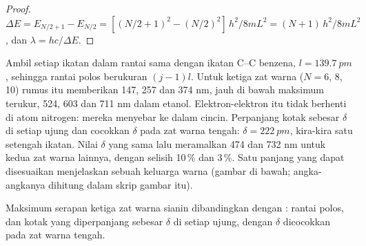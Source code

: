 \begin{proof}
$\Delta E = E_{N/2+1} - E_{N/2} = [(N/2+1)^2 - (N/2)^2]\,h^2/8mL^2 =
(N+1)\,h^2/8mL^2$, dan $\lambda = hc/\Delta E$.
\end{proof}

\begin{example}\label{ex:b3:quantum-model-systems:dyes}
Ambil setiap ikatan dalam rantai sama dengan ikatan C--C benzena,
$l = \qty{139.7}{pm}$, sehingga rantai polos berukuran $(j - 1)l$. Untuk
ketiga zat warna ($N = 6$, 8, 10) rumus itu memberikan 147, 257 dan 374 nm,
jauh di bawah maksimum terukur, 524, 603 dan 711 nm dalam etanol.
Elektron-elektron itu tidak berhenti di atom nitrogen: mereka menyebar ke
dalam cincin. Perpanjang kotak sebesar $\delta$ di setiap ujung dan
cocokkan $\delta$ pada zat warna tengah: $\delta = \qty{222}{pm}$, kira-kira
satu setengah ikatan. Nilai $\delta$ yang sama lalu meramalkan 474 dan
732 nm untuk kedua zat warna lainnya, dengan selisih 10\,\% dan 3\,\%. Satu
panjang yang dapat disesuaikan menjelaskan sebuah keluarga warna (gambar di
bawah; angka-angkanya dihitung dalam skrip gambar itu).
\end{example}

\begin{omfigure}

{\small Maksimum serapan ketiga zat warna sianin dibandingkan dengan : rantai polos, dan kotak yang diperpanjang sebesar $\delta$
di setiap ujung, dengan $\delta$ dicocokkan pada zat warna tengah.}
\end{omfigure}


